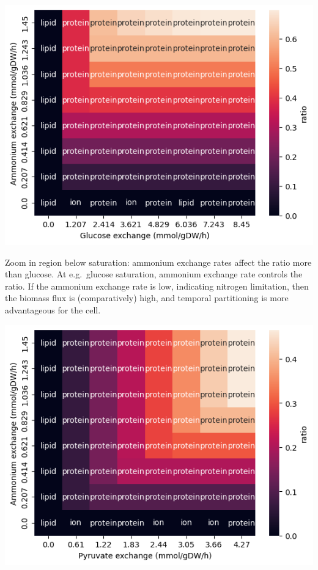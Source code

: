 \begin{center}
\includegraphics[width=.9\linewidth]{ecYeast8-ablation-heatmap-under_saturation_8x.png}
\end{center}

Zoom in region below saturation: ammonium exchange rates affect the ratio more than glucose.
At e.g.\ glucose saturation, ammonium exchange rate controls the ratio.
If the ammonium exchange rate is low, indicating nitrogen limitation, then the biomass flux is (comparatively) high, and temporal partitioning is more advantageous for the cell.

\begin{center}
\includegraphics[width=.9\linewidth]{ecYeast8-ablation-heatmap-pyruvate-under_saturation_8x.png}
\end{center}

